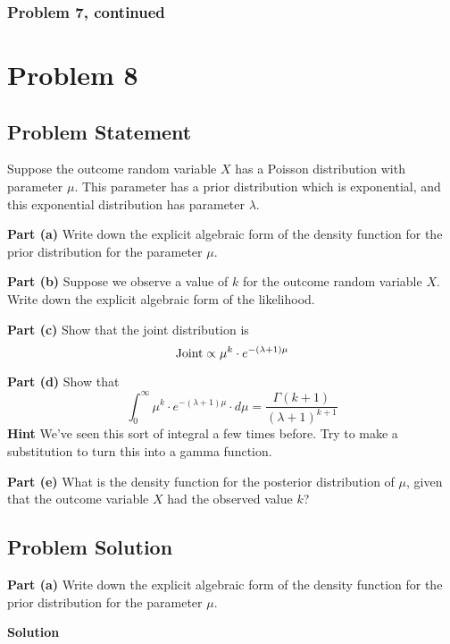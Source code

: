 \documentclass[12pt]{article}
\theoremstyle{definition}
\begin{document}
\subsubsection*{Problem 7, continued}



\newpage
\section*{Problem 8}

\subsection*{Problem Statement}

Suppose the outcome random variable $X$ has a Poisson distribution with parameter $\mu$. This parameter has a prior distribution which is exponential, and this exponential distribution has parameter $\lambda$.

\bigskip
\noindent
{\bf Part (a)} Write down the explicit algebraic form of the density function for the prior distribution for the parameter $\mu$.

\bigskip
\noindent
{\bf Part (b)} Suppose we observe a value of $k$ for the outcome random variable $X$. Write down the explicit algebraic form of the likelihood.

\bigskip
\noindent
{\bf Part (c)} Show that the joint distribution is
$$
\hbox{Joint} \propto \mu^k \cdot e^{-(\lambda + 1) \mu}
$$

\bigskip
\noindent
{\bf Part (d)} Show that
$$
\int_0^\infty \mu^{k} \cdot e^{-(\lambda+1) \mu} \cdot d\mu = \frac{ \Gamma( k + 1 ) }{(\lambda + 1)^{k+1} }
$$
\noindent
{\bf Hint} We've seen this sort of integral a few times before. Try to make a substitution to turn this into a gamma function.

\bigskip
\noindent
{\bf Part (e)} What is the density function for the posterior distribution of $\mu$, given that the outcome variable $X$ had the observed value $k$?


\newpage
\subsection*{Problem Solution}

\noindent
{\bf Part (a)} Write down the explicit algebraic form of the density function for the prior distribution for the parameter $\mu$.

\bigskip
\noindent
{\bf Solution}
\end{document}
